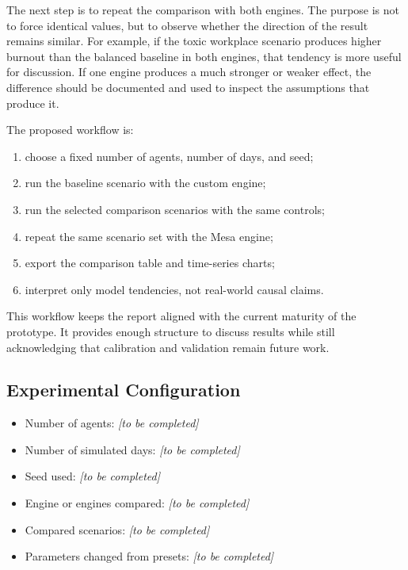 \documentclass[12pt,a4paper]{article}
\begin{document}
The next step is to repeat the comparison with both engines. The purpose is not to force identical values, but to observe whether the direction of the result remains similar. For example, if the toxic workplace scenario produces higher burnout than the balanced baseline in both engines, that tendency is more useful for discussion. If one engine produces a much stronger or weaker effect, the difference should be documented and used to inspect the assumptions that produce it.

The proposed workflow is:

\begin{enumerate}
    \item choose a fixed number of agents, number of days, and seed;
    \item run the baseline scenario with the custom engine;
    \item run the selected comparison scenarios with the same controls;
    \item repeat the same scenario set with the Mesa engine;
    \item export the comparison table and time-series charts;
    \item interpret only model tendencies, not real-world causal claims.
\end{enumerate}

This workflow keeps the report aligned with the current maturity of the prototype. It provides enough structure to discuss results while still acknowledging that calibration and validation remain future work.

\subsection{Experimental Configuration}

\begin{itemize}
    \item Number of agents: \textit{[to be completed]}
    \item Number of simulated days: \textit{[to be completed]}
    \item Seed used: \textit{[to be completed]}
    \item Engine or engines compared: \textit{[to be completed]}
    \item Compared scenarios: \textit{[to be completed]}
    \item Parameters changed from presets: \textit{[to be completed]}
\end{itemize}
\end{document}
